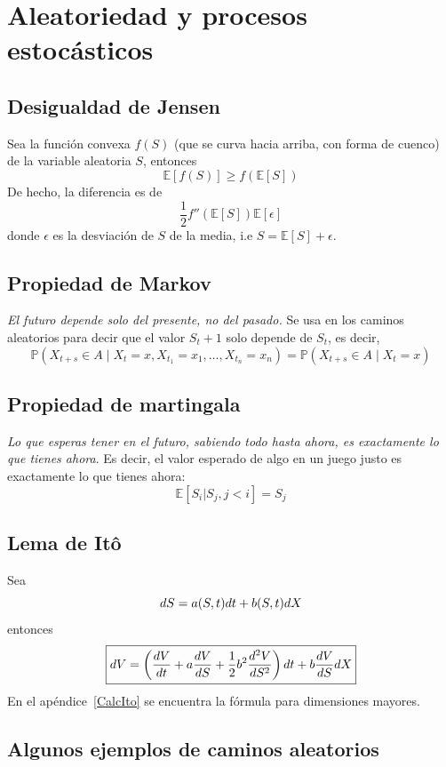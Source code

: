 
\section{Aleatoriedad y procesos estocásticos}

\subsection{Desigualdad de Jensen}
Sea la función convexa $f(S)$ (que se curva hacia arriba, con forma de cuenco) de la variable aleatoria $S$, entonces
\[\mathbb{E}[f(S)] \geq f(\mathbb{E}[S])\]
De hecho, la diferencia es de
\[\frac{1}{2}f''(\mathbb{E}[S])\mathbb{E}[\epsilon]\]
donde $\epsilon$ es la desviación de $S$ de la media, i.e $S=\mathbb{E}[S]+\epsilon$.


\subsection{Propiedad de Markov}
\textit{El futuro depende solo del presente, no del pasado.} Se usa en los caminos aleatorios para decir que el valor $S_t+1$ solo depende de $S_t$, es decir,
\[\mathbb{P}(X_{t+s} \in A \mid X_t = x, X_{t_1} = x_1, \ldots, X_{t_n} = x_n) 
= \mathbb{P}(X_{t+s} \in A \mid X_t = x)\]



\subsection{Propiedad de martingala}
\textit{Lo que esperas tener en el futuro, sabiendo todo hasta ahora, es exactamente lo que tienes ahora}. Es decir, el valor esperado de algo en un juego justo es exactamente lo que tienes ahora:
\[\mathbb{E}[S_i|S_j, j<i]=S_j\]



\subsection{Lema de Itô}
Sea
\[dS = a(S,t)dt + b(S,t)d\mathnormal{X}\]
entonces
\begin{equation}
    \boxed{dV = \left( \frac{dV}{dt} +  a\frac{dV}{dS} + \frac{1}{2}b^2\frac{d^2V}{dS^2} \right)dt + b\frac{dV}{dS}d\mathnormal{X}}
\end{equation}\label{Ito}
En el apéndice~\ref{CalcIto} se encuentra la fórmula para dimensiones mayores.

\subsection{Algunos ejemplos de caminos aleatorios}

